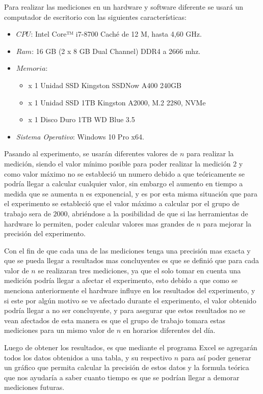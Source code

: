 \documentclass[11pt, twocolumn]{llncs}
\begin{document}
Para realizar las mediciones en un hardware y software diferente se usará un computador de escritorio con las siguientes características:

\begin{itemize}
    \item $CPU$: Intel Core™ i7-8700 Caché de 12 M, hasta 4,60 GHz.
    \item $Ram$: 16 GB (2 x 8 GB Dual Channel) DDR4 a 2666 mhz.
    \item $Memoria$:
        \begin{itemize}
             \item x 1 Unidad SSD Kingston SSDNow A400 240GB
        	 \item x 1 Unidad SSD 1TB Kingston A2000, M.2 2280, NVMe
        	 \item x 1 Disco Duro 1TB WD Blue 3.5
        \end{itemize}
    \item \textit{Sistema Operativo}: Windows 10 Pro x64.
\end{itemize}

Pasando al experimento, se usarán diferentes valores de $n$ para realizar la medición, siendo el valor mínimo posible para poder realizar la medición $2$ y como valor máximo no se estableció un numero debido a que teóricamente se podría llegar a calcular cualquier valor, sin embargo el aumento en tiempo a medida que se aumenta n es exponencial, y es por esta misma situación que para el experimento se estableció que el valor máximo a calcular por el grupo de trabajo sera de $2000$, abriéndose a la posibilidad de que si las herramientas de hardware lo permiten, poder calcular valores mas grandes de $n$ para mejorar la precisión del experimento.

Con el fin de que cada una de las mediciones tenga una precisión mas exacta y que se pueda llegar a resultados mas concluyentes es que se definió que para cada valor de $n$ se realizaran tres mediciones, ya que el solo tomar en cuenta una medición podría llegar a afectar el experimento, esto debido a que como se menciona anteriormente el hardware influye en los resultados del experimento, y si este por algún motivo se ve afectado durante el experimento, el valor obtenido podría llegar a no ser concluyente, y para asegurar que estos resultados no se vean afectados de esta manera es que el grupo de trabajo tomara estas mediciones para un mismo valor de $n$ en horarios diferentes del día.

Luego de obtener los resultados, es que mediante el programa Excel se agregarán todos los datos obtenidos a una tabla, y su respectivo $n$ para así poder generar un gráfico que permita calcular la precisión de estos datos y la formula teórica que nos ayudaría a saber cuanto tiempo es que se podrían llegar a demorar mediciones futuras.
\end{document}
